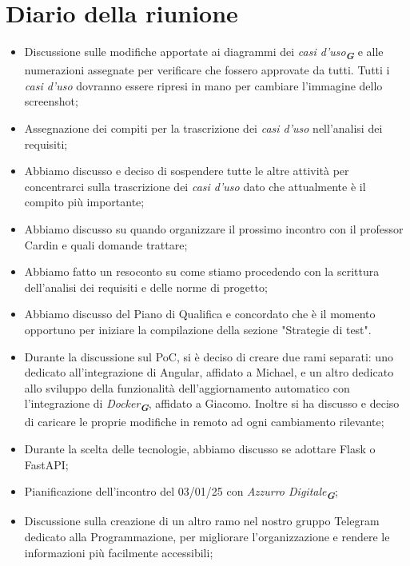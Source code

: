 
\section{Diario della riunione}

\begin{itemize}
    \item Discussione sulle modifiche apportate ai diagrammi dei \emph{casi d'uso}\textsubscript{\textit{\textbf{G}}} e alle numerazioni assegnate per verificare che fossero approvate da tutti. Tutti i \emph{casi d'uso} dovranno essere ripresi in mano per cambiare l'immagine dello screenshot;
    \item Assegnazione dei compiti per la trascrizione dei \emph{casi d'uso} nell'analisi dei requisiti;
    \item Abbiamo discusso e deciso di sospendere tutte le altre attività per concentrarci sulla trascrizione dei \emph{casi d'uso} dato che attualmente è il compito più importante;
    \item Abbiamo discusso su quando organizzare il prossimo incontro con il professor Cardin e quali domande trattare;
    \item Abbiamo fatto un resoconto su come stiamo procedendo con la scrittura dell'analisi dei requisiti e delle norme di progetto;
    \item Abbiamo discusso del Piano di Qualifica e concordato che è il momento opportuno per iniziare la compilazione della sezione "Strategie di test".
    \item Durante la discussione sul PoC, si è deciso di creare due rami separati: uno dedicato all'integrazione di Angular, affidato a Michael, e un altro dedicato allo sviluppo della funzionalità dell'aggiornamento automatico con l'integrazione di \emph{Docker}\textsubscript{\textit{\textbf{G}}}, affidato a Giacomo. Inoltre si ha discusso e deciso di caricare le proprie modifiche in remoto ad ogni cambiamento rilevante;
    \item Durante la scelta delle tecnologie, abbiamo discusso se adottare Flask o FastAPI; 
    \item Pianificazione dell'incontro del 03/01/25 con \emph{Azzurro Digitale}\textsubscript{\textit{\textbf{G}}};
    \item Discussione sulla creazione di un altro ramo nel nostro gruppo Telegram dedicato alla Programmazione, per migliorare l'organizzazione e rendere le informazioni più facilmente accessibili;
 \end{itemize}
